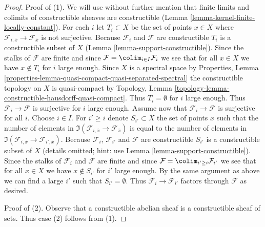 \begin{proof}
Proof of (1). We will use without further mention that finite limits
and colimits of constructible sheaves are constructible
(Lemma \ref{lemma-kernel-finite-locally-constant}).
For each $i$ let $T_i \subset X$ be the set of points $x \in X$
where $\mathcal{F}_{i, \overline{x}} \to \mathcal{F}_{\overline{x}}$
is not surjective. Because $\mathcal{F}_i$ and $\mathcal{F}$ are
constructible $T_i$ is a constructible subset of $X$
(Lemma \ref{lemma-support-constructible}).
Since the stalks of $\mathcal{F}$ are finite
and since $\mathcal{F} = \colim_{i \in I} \mathcal{F}_i$ we see
that for all $x \in X$ we have $x \not \in T_i$ for $i$ large enough.
Since $X$ is a spectral space by Properties, Lemma
\ref{properties-lemma-quasi-compact-quasi-separated-spectral}
the constructible topology on $X$ is quasi-compact by
Topology, Lemma \ref{topology-lemma-constructible-hausdorff-quasi-compact}.
Thus $T_i = \emptyset$ for $i$ large enough. Thus
$\mathcal{F}_i \to \mathcal{F}$ is surjective for $i$ large enough.
Assume now that $\mathcal{F}_i \to \mathcal{F}$ is surjective for all $i$.
Choose $i \in I$. For $i' \geq i$ denote $S_{i'} \subset X$ the set of
points $x$ such that the number of elements in
$\Im(\mathcal{F}_{i, \overline{x}} \to \mathcal{F}_{\overline{x}})$
is equal to the number of elements in
$\Im(\mathcal{F}_{i, \overline{x}} \to \mathcal{F}_{i', \overline{x}})$.
Because $\mathcal{F}_i$, $\mathcal{F}_{i'}$ and $\mathcal{F}$ are
constructible $S_{i'}$ is a constructible subset of $X$
(details omitted; hint: use Lemma \ref{lemma-support-constructible}).
Since the stalks of $\mathcal{F}_i$ and $\mathcal{F}$
are finite and since $\mathcal{F} = \colim_{i' \geq i} \mathcal{F}_{i'}$
we see that for all $x \in X$ we have $x \not \in S_{i'}$ for $i'$
large enough. By the same argument as above we can find a large $i'$ such
that $S_{i'} = \emptyset$. Thus $\mathcal{F}_i \to \mathcal{F}_{i'}$
factors through $\mathcal{F}$ as desired.

\medskip\noindent
Proof of (2). Observe that a constructible abelian sheaf is a constructible
sheaf of sets. Thus case (2) follows from (1).


\end{proof}
